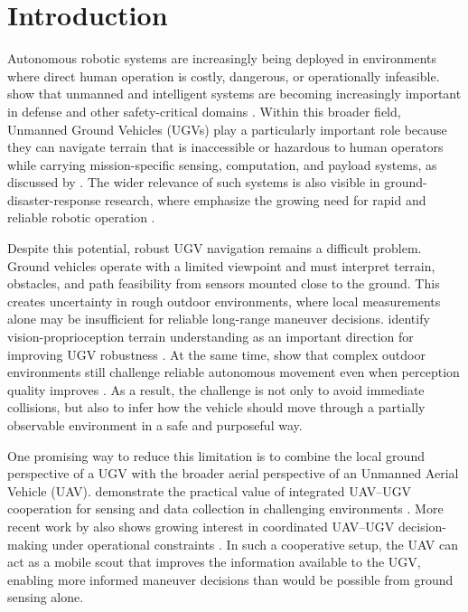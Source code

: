 
\chapter{Introduction}
\label{ch:introduction}

Autonomous robotic systems are increasingly being deployed in environments where direct human operation is costly, dangerous, or operationally infeasible. \citeauthor{bhatia2026integration} show that unmanned and intelligent systems are becoming increasingly important in defense and other safety-critical domains \citep{bhatia2026integration}. Within this broader field, Unmanned Ground Vehicles (UGVs) play a particularly important role because they can navigate terrain that is inaccessible or hazardous to human operators while carrying mission-specific sensing, computation, and payload systems, as discussed by \citeauthor{krecht2023resilience} \citep{krecht2023resilience}. The wider relevance of such systems is also visible in ground-disaster-response research, where \citeauthor{sotovergel2023transforming} emphasize the growing need for rapid and reliable robotic operation \citep{sotovergel2023transforming}.

Despite this potential, robust UGV navigation remains a difficult problem. Ground vehicles operate with a limited viewpoint and must interpret terrain, obstacles, and path feasibility from sensors mounted close to the ground. This creates uncertainty in rough outdoor environments, where local measurements alone may be insufficient for reliable long-range maneuver decisions. \citeauthor{chen2021cnn} identify vision-proprioception terrain understanding as an important direction for improving UGV robustness \citep{chen2021cnn}. At the same time, \citeauthor{chen2026obstacle} show that complex outdoor environments still challenge reliable autonomous movement even when perception quality improves \citep{chen2026obstacle}. As a result, the challenge is not only to avoid immediate collisions, but also to infer how the vehicle should move through a partially observable environment in a safe and purposeful way.

One promising way to reduce this limitation is to combine the local ground perspective of a UGV with the broader aerial perspective of an Unmanned Aerial Vehicle (UAV). \citeauthor{asadi2020integrated} demonstrate the practical value of integrated UAV--UGV cooperation for sensing and data collection in challenging environments \citep{asadi2020integrated}. More recent work by \citeauthor{mondal2025risk} also shows growing interest in coordinated UAV--UGV decision-making under operational constraints \citep{mondal2025risk}. In such a cooperative setup, the UAV can act as a mobile scout that improves the information available to the UGV, enabling more informed maneuver decisions than would be possible from ground sensing alone.

